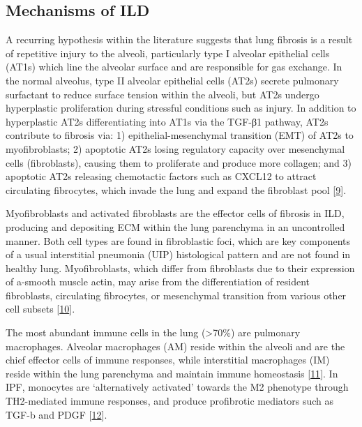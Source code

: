 \documentclass[
]{article}
\begin{document}
\hypertarget{mechanisms-of-ild}{%
\subsection{Mechanisms of ILD}\label{mechanisms-of-ild}}

A recurring hypothesis within the literature suggests that lung fibrosis is a result of repetitive injury to the alveoli, particularly type I alveolar epithelial cells (AT1s) which line the alveolar surface and are responsible for gas exchange. In the normal alveolus, type II alveolar epithelial cells (AT2s) secrete pulmonary surfactant to reduce surface tension within the alveoli, but AT2s undergo hyperplastic proliferation during stressful conditions such as injury. In addition to hyperplastic AT2s differentiating into AT1s via the TGF-β1 pathway, AT2s contribute to fibrosis via: 1) epithelial-mesenchymal transition (EMT) of AT2s to myofibroblasts; 2) apoptotic AT2s losing regulatory capacity over mesenchymal cells (fibroblasts), causing them to proliferate and produce more collagen; and 3) apoptotic AT2s releasing chemotactic factors such as CXCL12 to attract circulating fibrocytes, which invade the lung and expand the fibroblast pool {[}\protect\hyperlink{ref-bagnato_cellular_2015}{9}{]}.

Myofibroblasts and activated fibroblasts are the effector cells of fibrosis in ILD, producing and depositing ECM within the lung parenchyma in an uncontrolled manner. Both cell types are found in fibroblastic foci, which are key components of a usual interstitial pneumonia (UIP) histological pattern and are not found in healthy lung. Myofibroblasts, which differ from fibroblasts due to their expression of a-smooth muscle actin, may arise from the differentiation of resident fibroblasts, circulating fibrocytes, or mesenchymal transition from various other cell subsets {[}\protect\hyperlink{ref-marconi_epithelial-mesenchymal_2021}{10}{]}.

The most abundant immune cells in the lung (\textgreater70\%) are pulmonary macrophages. Alveolar macrophages (AM) reside within the alveoli and are the chief effector cells of immune responses, while interstitial macrophages (IM) reside within the lung parenchyma and maintain immune homeostasis {[}\protect\hyperlink{ref-byrne_pulmonary_2015}{11}{]}. In IPF, monocytes are `alternatively activated' towards the M2 phenotype through TH2-mediated immune responses, and produce profibrotic mediators such as TGF-b and PDGF {[}\protect\hyperlink{ref-zhu_m2_2017}{12}{]}.
\end{document}
